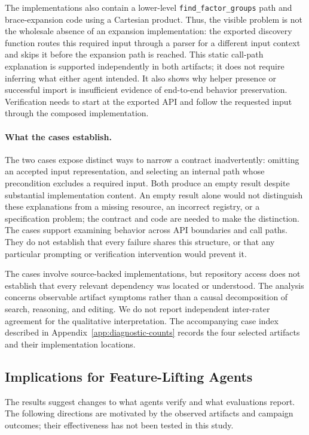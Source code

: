 \documentclass[acmsmall,screen,review,anonymous,nonacm]{acmart}
\begin{document}
The implementations also contain a lower-level \texttt{find\_factor\_groups}
path and brace-expansion code using a Cartesian product. Thus, the visible
problem is not the wholesale absence of an expansion implementation: the
exported discovery function routes this required input through a parser for a
different input context and skips it before the expansion path is reached.
This static call-path explanation is supported independently in both artifacts;
it does not require inferring what either agent intended. It also shows why
helper presence or successful import is insufficient evidence of end-to-end
behavior preservation. Verification needs to start at the exported API and
follow the requested input through the composed implementation.

\paragraph{What the cases establish.}
The two cases expose distinct ways to narrow a contract inadvertently: omitting
an accepted input representation, and selecting an internal path whose
precondition excludes a required input. Both produce an empty result despite
substantial implementation content. An empty result alone would not distinguish
these explanations from a missing resource, an incorrect registry, or a
specification problem; the contract and code are needed to make the distinction.
The cases support examining behavior across API boundaries and call paths.
They do not establish that every failure shares this structure, or that any
particular prompting or verification intervention would prevent it.

The cases involve source-backed implementations, but repository access does
not establish that every relevant dependency was located or understood.
The analysis concerns observable artifact symptoms rather than a causal
decomposition of search, reasoning, and editing. We do not report independent
inter-rater agreement for the qualitative interpretation.
The accompanying case index described in Appendix~\ref{app:diagnostic-counts}
records the four selected artifacts and their implementation locations.

\subsection{Implications for Feature-Lifting Agents}
\label{sec:discussion}

The results suggest changes to what agents verify and what evaluations report.
The following directions are motivated by the observed artifacts and campaign
outcomes; their effectiveness has not been tested in this study.
\end{document}
